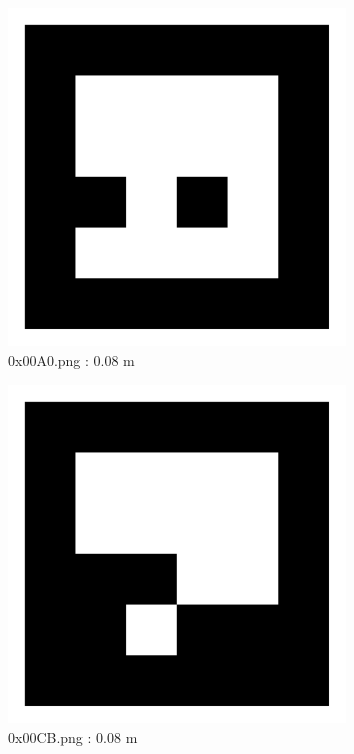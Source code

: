 \documentclass[11pt,a4,BCOR=0cm]{scrartcl}
\begin{document}
\begin{figure}
  \centering
    \includegraphics[width=8.955cm]{0x00A0.pdf}
    \caption{0x00A0.png : 0.08 m}
    \label{fig:0x00A0.pdf}
  
\end{figure} 

\begin{figure}
  \centering
    \includegraphics[width=8.955cm]{0x00CB.pdf}
    \caption{0x00CB.png : 0.08 m}
    \label{fig:0x00CB.pdf}
  
\end{figure} 

\clearpage
\end{document}
